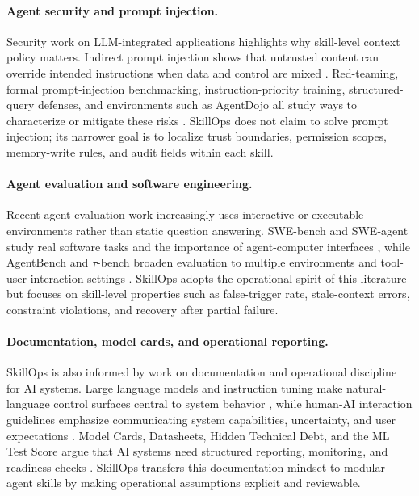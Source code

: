 \documentclass[11pt]{article}
\begin{document}
\paragraph{Agent security and prompt injection.}

Security work on LLM-integrated applications highlights why skill-level context
policy matters. Indirect prompt injection shows that untrusted content can
override intended instructions when data and control are mixed
\citep{greshake2023notwhat}. Red-teaming, formal prompt-injection benchmarking,
instruction-priority training, structured-query defenses, and environments such
as AgentDojo all study ways to characterize or mitigate these risks
\citep{ganguli2022redteaming,liu2024formalizingprompt,wallace2024instructionhierarchy,chen2025struq,debenedetti2024agentdojo}.
SkillOps does not claim to solve prompt injection; its narrower goal is to
localize trust boundaries, permission scopes, memory-write rules, and audit
fields within each skill.

\paragraph{Agent evaluation and software engineering.}

Recent agent evaluation work increasingly uses interactive or executable
environments rather than static question answering. SWE-bench and SWE-agent
study real software tasks and the importance of agent-computer interfaces
\citep{jimenez2024swebench,yang2024sweagent}, while AgentBench and
\(\tau\)-bench broaden evaluation to multiple environments and tool-user
interaction settings \citep{liu2024agentbench,yao2025taubench}.
SkillOps adopts the operational spirit of this literature but focuses on
skill-level properties such as false-trigger rate, stale-context errors,
constraint violations, and recovery after partial failure.

\paragraph{Documentation, model cards, and operational reporting.}

SkillOps is also informed by work on documentation and operational discipline
for AI systems. Large language models and instruction tuning make
natural-language control surfaces central to system behavior
\citep{brown2020language,ouyang2022training}, while human-AI interaction
guidelines emphasize communicating system capabilities, uncertainty, and user
expectations \citep{amershi2019guidelines}. Model Cards, Datasheets, Hidden
Technical Debt, and the ML Test Score argue that AI systems need structured
reporting, monitoring, and readiness checks
\citep{mitchell2019modelcards,gebru2021datasheets,sculley2015hidden,breck2017mltestscore}.
SkillOps transfers this documentation mindset to modular agent skills by making
operational assumptions explicit and reviewable.
\end{document}
